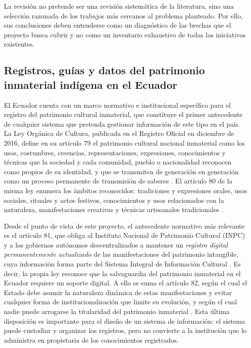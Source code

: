La revisión no pretende ser una revisión sistemática de la literatura, sino una selección razonada de los trabajos más cercanos al problema planteado. Por ello, sus conclusiones deben entenderse como un diagnóstico de las brechas que el proyecto busca cubrir y no como un inventario exhaustivo de todas las iniciativas existentes.

\subsection{Registros, guías y datos del patrimonio inmaterial indígena en el Ecuador}
El Ecuador cuenta con un marco normativo e institucional específico para el registro del patrimonio cultural inmaterial, que constituye el primer antecedente de cualquier sistema que pretenda gestionar información de este tipo en el país. La Ley Orgánica de Cultura, publicada en el Registro Oficial en diciembre de 2016, define en su artículo 79 el patrimonio cultural nacional inmaterial como los usos, costumbres, creencias, representaciones, expresiones, conocimientos y técnicas que la sociedad y cada comunidad, pueblo o nacionalidad reconocen como propios de su identidad, y que se transmiten de generación en generación como un proceso permanente de transmisión de saberes \cite{ecuador2016cultura}. El artículo 80 de la misma ley enumera los ámbitos reconocidos: tradiciones y expresiones orales, usos sociales, rituales y actos festivos, conocimientos y usos relacionados con la naturaleza, manifestaciones creativas y técnicas artesanales tradicionales \cite{ecuador2016cultura}.

Desde el punto de vista de este proyecto, el antecedente normativo más relevante es el artículo 81, que obliga al Instituto Nacional de Patrimonio Cultural (INPC) y a los gobiernos autónomos descentralizados a mantener un \textit{registro digital permanentemente actualizado} de las manifestaciones del patrimonio intangible, cuya información forma parte del Sistema Integral de Información Cultural \cite{ecuador2016cultura}. Es decir, la propia ley reconoce que la salvaguardia del patrimonio inmaterial en el Ecuador requiere un soporte digital. A ello se suma el artículo 82, según el cual el Estado debe asumir la naturaleza dinámica de estas manifestaciones y evitar cualquier forma de institucionalización que limite su evolución, y según el cual nadie puede arrogarse la titularidad del patrimonio inmaterial \cite{ecuador2016cultura}. Esta última disposición es importante para el diseño de un sistema de información: el sistema puede custodiar y organizar los registros, pero no convierte a la institución que lo administra en propietaria de los conocimientos registrados.

